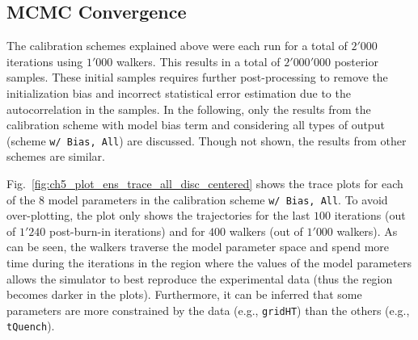\subsection{MCMC Convergence}\label{sub:bc_mcmc_convergence}

The calibration schemes explained above were each run for a total of $2'000$ iterations using $1'000$ walkers. 
This results in a total of $2'000'000$ posterior samples.
These initial samples requires further post-process\-ing to remove the initialization bias and incorrect statistical error estimation due to the autocorrelation in the samples.
In the following, only the results from the calibration scheme with model bias term and considering all types of output (scheme \texttt{w/ Bias, All}) are discussed.
Though not shown, the results from other schemes are similar.

Fig.~\ref{fig:ch5_plot_ens_trace_all_disc_centered} shows the trace plots for each of the $8$ model parameters in the calibration scheme \texttt{w/ Bias, All}.
To avoid over-plotting, the plot only shows the trajectories for the last $100$ iterations (out of $1'240$ post-burn-in iterations) and for $400$ walkers (out of $1'000$ walkers). 
As can be seen, the walkers traverse the model parameter space and spend more time during the iterations in the region where the values of the model parameters allows the simulator to best reproduce the experimental data (thus the region becomes darker in the plots).
Furthermore, it can be inferred that some parameters are more constrained by the data (e.g., \texttt{gridHT}) than the others (e.g., \texttt{tQuench}).

